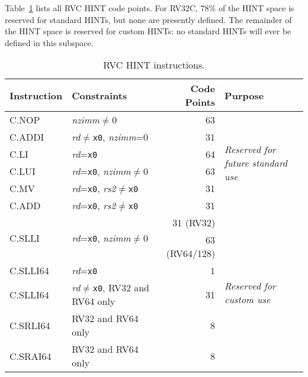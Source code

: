 Table~\ref{tab:rvc-hints} lists all RVC HINT code points.  For RV32C, 78\% of
the HINT space is reserved for standard HINTs, but none are presently defined.
The remainder of the HINT space is reserved for custom HINTs: no standard
HINTs will ever be defined in this subspace.

\begin{table}[hbt]
\centering
\begin{tabular}{|l|l|r|l|}
  \hline
  Instruction             & Constraints                                 & Code Points & Purpose \\ \hline \hline
  C.NOP                   & {\em nzimm}$\neq$0                          & 63          & \multirow{6}{*}{\em Reserved for future standard use} \\ \cline{1-3}
  C.ADDI                  & {\em rd}$\neq${\tt x0}, {\em nzimm}=0       & 31          & \\ \cline{1-3}
  C.LI                    & {\em rd}={\tt x0}                           & 64          & \\ \cline{1-3}
  C.LUI                   & {\em rd}={\tt x0}, {\em nzimm}$\neq$0       & 63          & \\ \cline{1-3}
  C.MV                    & {\em rd}={\tt x0}, {\em rs2}$\neq${\tt x0}  & 31          & \\ \cline{1-3}
  C.ADD                   & {\em rd}={\tt x0}, {\em rs2}$\neq${\tt x0}  & 31          & \\ \hline \hline
  \multirow{2}{*}{C.SLLI} & \multirow{2}{*}{{\em rd}={\tt x0}, {\em nzimm}$\neq$0} & 31 (RV32)   & \multirow{6}{*}{\em Reserved for custom use} \\
                          &                                             & 63 (RV64/128) & \\ \cline{1-3}
  C.SLLI64                & {\em rd}={\tt x0}                           & 1           & \\ \cline{1-3}
  C.SLLI64                & {\em rd}$\neq${\tt x0}, RV32 and RV64 only  & 31          & \\ \cline{1-3}
  C.SRLI64                & RV32 and RV64 only                          & 8           & \\ \cline{1-3}
  C.SRAI64                & RV32 and RV64 only                          & 8           & \\ \hline
\end{tabular}
\caption{RVC HINT instructions.}
\label{tab:rvc-hints}
\end{table}

